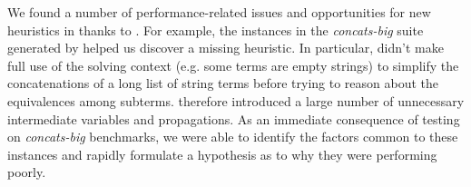 We found a number of performance-related issues and opportunities for
new heuristics in \us{} thanks to \fuzzer{}. For example, the
instances in the \textit{concats-big} suite generated by \fuzzer{}
helped us discover a missing heuristic. In particular, \us{} didn't
make full use of the solving context (e.g. some terms are empty
strings) to simplify the concatenations of a long list of string terms
before trying to reason about the equivalences among subterms. \us{}
therefore introduced a large number of unnecessary intermediate
variables and propagations. As an immediate consequence of
testing \us{} on \textit{concats-big} benchmarks, we were able to
identify the factors common to these instances and rapidly formulate a
hypothesis as to why they were performing poorly.
